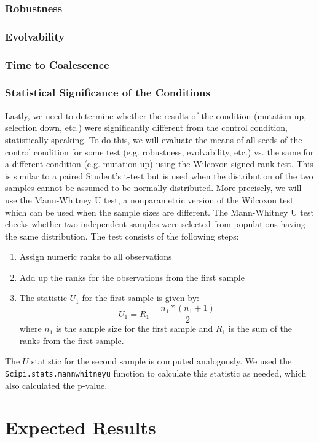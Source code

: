 \subsubsection{Robustness}
\subsubsection{Evolvability}
\subsubsection{Time to Coalescence}

\subsubsection{Statistical Significance of the Conditions}
Lastly, we need to determine whether the results of the condition (mutation up, selection down, etc.) were significantly different from the control condition, statistically speaking. To do this, we will evaluate the means of all seeds of the control condition for some test (e.g. robustness, evolvability, etc.) vs. the same for a different condition (e.g. mutation up) using the Wilcoxon signed-rank test. This is similar to a paired Student's t-test but is used when the distribution of the two samples cannot be assumed to be normally distributed. More precisely, we will use the Mann-Whitney U test, a nonparametric version of the Wilcoxon test which can be used when the sample sizes are different. The Mann-Whitney U test checks whether two independent samples were selected from populations having the same distribution. The test consists of the following steps:
\begin{enumerate}
	\item Assign numeric ranks to all observations
	\item Add up the ranks for the observations from the first sample
	\item The statistic $U_1$ for the first sample is given by:
	\begin{equation*}
	U_1 = R_1 - \frac{n_1*(n_1 + 1)}{2}
	\end{equation*}
	where $n_1$ is the sample size for the first sample and $R_1$ is the sum of the ranks from the first sample.
\end{enumerate}
The $U$ statistic for the second sample is computed analogously. We used the \texttt{Scipi.stats.mannwhitneyu} function to calculate this statistic as needed, which also calculated the p-value. 

\section{Expected Results}





